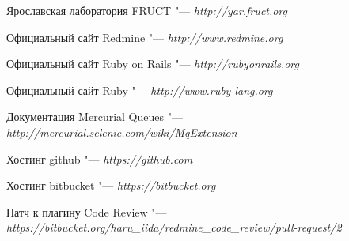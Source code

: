 \begin{thebibliography}{99}

Ярославская лаборатория FRUCT "--- \textit{http://yar.fruct.org}

Официальный сайт Redmine "--- \textit{http://www.redmine.org}

Официальный сайт Ruby on Rails "--- \textit{http://rubyonrails.org}

Официальный сайт Ruby "--- \textit{http://www.ruby-lang.org}

Документация Mercurial
Queues "--- \textit{http://mercurial.selenic.com/wiki/MqExtension}

Хостинг github "--- \textit{https://github.com}

Хостинг bitbucket "--- \textit{https://bitbucket.org}

Патч к плагину Code Review "---
\textit{https://bitbucket.org/haru\_iida/redmine\_code\_review/pull-request/2}

\end{thebibliography}
